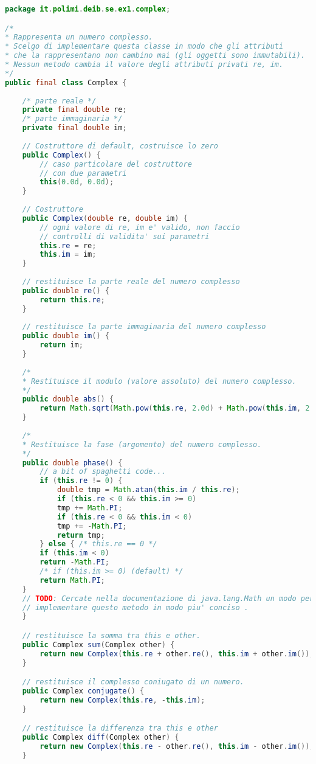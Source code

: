 \documentclass{article}
\begin{document}
\begin{lstlisting}[language=Java,escapechar=|]
package it.polimi.deib.se.ex1.complex;

/*
* Rappresenta un numero complesso.
* Scelgo di implementare questa classe in modo che gli attributi
* che la rappresentano non cambino mai (gli oggetti sono immutabili).
* Nessun metodo cambia il valore degli attributi privati re, im.
*/
public final class Complex {
	
	/* parte reale */
	private final double re;
	/* parte immaginaria */
	private final double im;
	
	// Costruttore di default, costruisce lo zero
	public Complex() {
		// caso particolare del costruttore
		// con due parametri
		this(0.0d, 0.0d);
	}
	
	// Costruttore
	public Complex(double re, double im) {
		// ogni valore di re, im e' valido, non faccio
		// controlli di validita' sui parametri
		this.re = re;
		this.im = im;
	}
	
	// restituisce la parte reale del numero complesso
	public double re() {
		return this.re;
	}
	
	// restituisce la parte immaginaria del numero complesso
	public double im() {
		return im;
	}
	
	/*
	* Restituisce il modulo (valore assoluto) del numero complesso.
	*/
	public double abs() {
		return Math.sqrt(Math.pow(this.re, 2.0d) + Math.pow(this.im, 2.0d));
	}
	
	/*
	* Restituisce la fase (argomento) del numero complesso.
	*/
	public double phase() {
		// a bit of spaghetti code...
		if (this.re != 0) {
			double tmp = Math.atan(this.im / this.re);
			if (this.re < 0 && this.im >= 0)
			tmp += Math.PI;
			if (this.re < 0 && this.im < 0)
			tmp += -Math.PI;
			return tmp;
		} else { /* this.re == 0 */
		if (this.im < 0)
		return -Math.PI;
		/* if (this.im >= 0) (default) */
		return Math.PI;
	}
	// TODO: Cercate nella documentazione di java.lang.Math un modo per
	// implementare questo metodo in modo piu' conciso .
    }

    // restituisce la somma tra this e other.
    public Complex sum(Complex other) {
    	return new Complex(this.re + other.re(), this.im + other.im());
    }

    // restituisce il complesso coniugato di un numero.
    public Complex conjugate() {
	    return new Complex(this.re, -this.im);
    }

    // restituisce la differenza tra this e other
    public Complex diff(Complex other) {
	    return new Complex(this.re - other.re(), this.im - other.im());
    }


\end{lstlisting}
\end{document}
